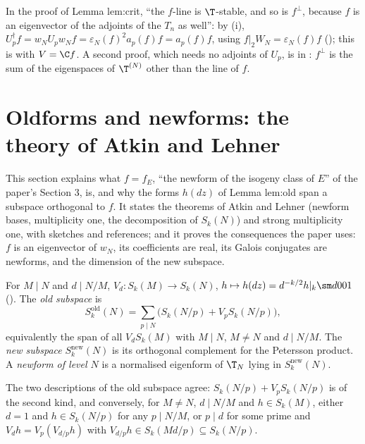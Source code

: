\begin{paperlink}\label{pl:hecke:adjoints}
In the proof of Lemma lem:crit, ``the $f$-line is $\T$-stable, and so is $f^\perp$, because $f$ is an eigenvector of the adjoints of the $T_n$ as well'': by (i),
$U_p^\dagger f=w_NU_pw_Nf=\varepsilon_N(f)^2a_p(f)f=a_p(f)f$, using $f|_2W_N=\varepsilon_N(f)f$ (); this is  with $V=\C f$. A second proof,
which needs no adjoints of $U_p$, is in : $f^\perp$ is the sum of the eigenspaces of $\T^{(N)}$ other than the line of $f$.
\end{paperlink}

\section{Oldforms and newforms: the theory of Atkin and Lehner}\label{sec:hecke:newforms}

This section explains what $f=f_E$, ``the newform of the isogeny class of $E$'' of the paper's Section 3, is, and why the forms $h(dz)$ of Lemma lem:old span a subspace orthogonal to $f$. It
states the theorems of Atkin and Lehner (newform bases, multiplicity one, the decomposition of $S_k(N)$) and strong multiplicity one, with sketches and references; and it
proves the consequences the paper uses: $f$ is an eigenvector of $w_N$, its coefficients are real, its Galois conjugates are newforms, and the dimension of the new
subspace.

\begin{definition}\label{def:hecke:old-new}
For $M\mid N$ and $d\mid N/M$, $V_d\colon S_k(M)\to S_k(N)$, $h\mapsto h(dz)=d^{-k/2}h|_k\sm d001$ (). The \emph{old subspace} is
\[
S_k^{\mathrm{old}}(N)=\sum_{p\mid N}\bigl(S_k(N/p)+V_pS_k(N/p)\bigr),
\]
equivalently the span of all $V_dS_k(M)$ with $M\mid N$, $M\ne N$ and $d\mid N/M$. The \emph{new subspace} $S_k^{\mathrm{new}}(N)$ is its orthogonal complement for the Petersson product. A
\emph{newform of level $N$} is a normalised eigenform of $\T_N$ lying in $S_k^{\mathrm{new}}(N)$.
\end{definition}

The two descriptions of the old subspace agree: $S_k(N/p)+V_pS_k(N/p)$ is of the second kind, and conversely, for $M\ne N$, $d\mid N/M$ and $h\in S_k(M)$, either $d=1$ and
$h\in S_k(N/p)$ for any $p\mid N/M$, or $p\mid d$ for some prime and $V_dh=V_p(V_{d/p}h)$ with $V_{d/p}h\in S_k(Md/p)\subseteq S_k(N/p)$.

